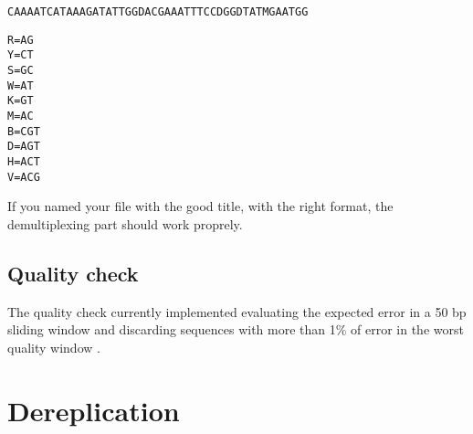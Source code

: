 \documentclass{article}\usepackage[]{graphicx}\usepackage[]{color}
\makeatletter
\newcommand{\hlstd}[1]{\textcolor[rgb]{0.345,0.345,0.345}{#1}}%
\newcommand{\hlkwb}[1]{\textcolor[rgb]{0.69,0.353,0.396}{#1}}%
\newenvironment{kframe}{%
 \def\at@end@of@kframe{}%
 \ifinner\ifhmode%
  \def\at@end@of@kframe{\end{minipage}}%
  \begin{minipage}{\columnwidth}%
 \fi\fi%
 \def\FrameCommand##1{\hskip\@totalleftmargin \hskip-\fboxsep
 \colorbox{shadecolor}{##1}\hskip-\fboxsep
     \hskip-\linewidth \hskip-\@totalleftmargin \hskip\columnwidth}%
 \MakeFramed {\advance\hsize-\width
   \@totalleftmargin\z@ \linewidth\hsize
   \@setminipage}}%
 {\par\unskip\endMakeFramed%
 \at@end@of@kframe}
\newenvironment{knitrout}{}{} %
\makeatother
\begin{document}
\begin{knitrout}
\color{fgcolor}\begin{kframe}
\begin{alltt}
CAAAATCATAAAGATATTGGDAC	GAAATTTCCDGGDTATMGAATGG
\end{alltt}
\end{kframe}
\end{knitrout}

\begin{knitrout}
\color{fgcolor}\begin{kframe}
\begin{alltt}
\hlstd{R} \hlkwb{=} \hlstd{AG}
\hlstd{Y} \hlkwb{=} \hlstd{CT}
\hlstd{S} \hlkwb{=} \hlstd{GC}
\hlstd{W} \hlkwb{=} \hlstd{AT}
\hlstd{K} \hlkwb{=} \hlstd{GT}
\hlstd{M} \hlkwb{=} \hlstd{AC}
\hlstd{B} \hlkwb{=} \hlstd{CGT}
\hlstd{D} \hlkwb{=} \hlstd{AGT}
\hlstd{H} \hlkwb{=} \hlstd{ACT}
\hlstd{V} \hlkwb{=} \hlstd{ACG}
\end{alltt}
\end{kframe}
\end{knitrout}

If you named your file with the good title, with the right format, the demultiplexing part should work proprely.

\subsection{Quality check}
\label{subsec:qualcheck}

The quality check currently implemented evaluating the expected error in a 50 bp sliding window and discarding sequences with more than 1\% of error in the worst quality window \cite{DeVargas2015}.



\section{Dereplication}






\end{document}
